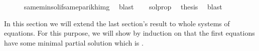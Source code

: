 \begin{isabellebody}
\ \ \ \ \isamarkupfalse%
\ same{\isacharunderscore}{\kern0pt}min{\isacharunderscore}{\kern0pt}sol{\isacharunderscore}{\kern0pt}if{\isacharunderscore}{\kern0pt}same{\isacharunderscore}{\kern0pt}parikh{\isacharunderscore}{\kern0pt}img\ \isamarkupfalse%
\ blast\isanewline
\ \ \isamarkupfalse%
\ sol{\isacharunderscore}{\kern0pt}prop\ \isamarkupfalse%
\ {\isacharquery}{\kern0pt}thesis\ \isamarkupfalse%
\ blast\isanewline
{}\isamarkupfalse%
%
\endisatagproof
{\isafoldproof}%
%
\isadelimproof
%
\endisadelimproof
%
\isadelimdocument
%
\endisadelimdocument
%
\isatagdocument
%
\isamarkuptrue%
%
\endisatagdocument
{\isafolddocument}%
%
\isadelimdocument
%
\endisadelimdocument
%
\begin{isamarkuptext}%
In this section we will extend the last section's result to whole systems of equations.
For this purpose, we will show by induction on  that the first  equations have
some minimal partial solution which is .


\end{isamarkuptext}
\end{isabellebody}
